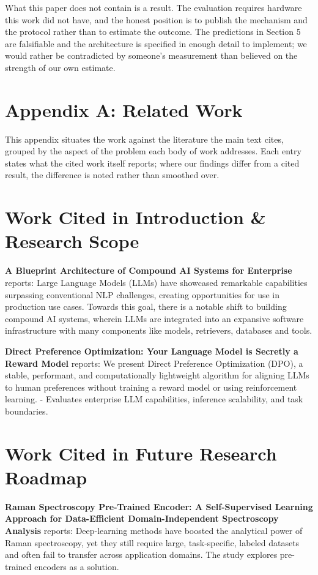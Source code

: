 \documentclass{article}
\begin{document}
What this paper does not contain is a result. The evaluation requires hardware this work did not have, and the honest position is to publish the mechanism and the protocol rather than to estimate the outcome. The predictions in Section 5 are falsifiable and the architecture is specified in enough detail to implement; we would rather be contradicted by someone's measurement than believed on the strength of our own estimate.




\section{Appendix A: Related Work}


This appendix situates the work against the literature the main text cites, grouped by the aspect of the problem each body of work addresses. Each entry states what the cited work itself reports; where our findings differ from a cited result, the difference is noted rather than smoothed over.


\section{Work Cited in Introduction \& Research Scope}


\textbf{A Blueprint Architecture of Compound AI Systems for Enterprise} \cite{arxiv_2406_00584} reports: Large Language Models (LLMs) have showcased remarkable capabilities surpassing conventional NLP challenges, creating opportunities for use in production use cases. Towards this goal, there is a notable shift to building compound AI systems, wherein LLMs are integrated into an expansive software infrastructure with many components like models, retrievers, databases and tools.

\textbf{Direct Preference Optimization: Your Language Model is Secretly a Reward Model} \cite{arxiv_2305_18290} reports: We present Direct Preference Optimization (DPO), a stable, performant, and computationally lightweight algorithm for aligning LLMs to human preferences without training a reward model or using reinforcement learning. - Evaluates enterprise LLM capabilities, inference scalability, and task boundaries.


\section{Work Cited in Future Research Roadmap}


\textbf{Raman Spectroscopy Pre-Trained Encoder: A Self-Supervised Learning Approach for Data-Efficient Domain-Independent Spectroscopy Analysis} \cite{doaj_001772c2113c476d9d5d40452c8e10e1} reports: Deep-learning methods have boosted the analytical power of Raman spectroscopy, yet they still require large, task-specific, labeled datasets and often fail to transfer across application domains. The study explores pre-trained encoders as a solution.
\end{document}
